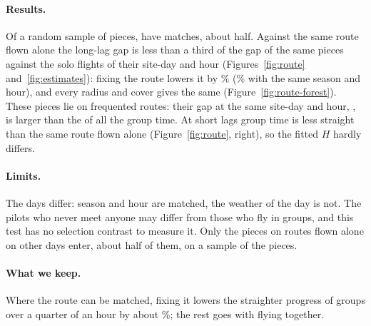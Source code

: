 \paragraph{Results.} Of a random sample of \RouteSample{} pieces, \RoutePieces{} have matches, about
half. Against the same route flown alone the long-lag gap is less than a third of the gap of the same
pieces against the solo flights of their site-day and hour (Figures~\ref{fig:route}
and~\ref{fig:estimates}): fixing the route lowers it by \RouteExplained\% (\RouteExplainedSeason\%
with the same season and hour), and every radius and cover gives the same
(Figure~\ref{fig:route-forest}). These pieces lie on frequented routes: their gap at the same site-day
and hour, \RouteBaseDHloc, is larger than the \DHlocThousandSdh{} of all the group time. At short lags
group time is less straight than the same route flown alone (Figure~\ref{fig:route}, right), so the
fitted $H$ hardly differs.

\paragraph{Limits.} The days differ: season and hour are matched, the weather of the day is not. The
pilots who never meet anyone may differ from those who fly in groups, and this test has no selection
contrast to measure it. Only the pieces on routes flown alone on other days enter, about half of them,
on a sample of the pieces.

\paragraph{What we keep.} Where the route can be matched, fixing it lowers the straighter progress of
groups over a quarter of an hour by about \RouteExplained\%; the rest goes with flying together.
